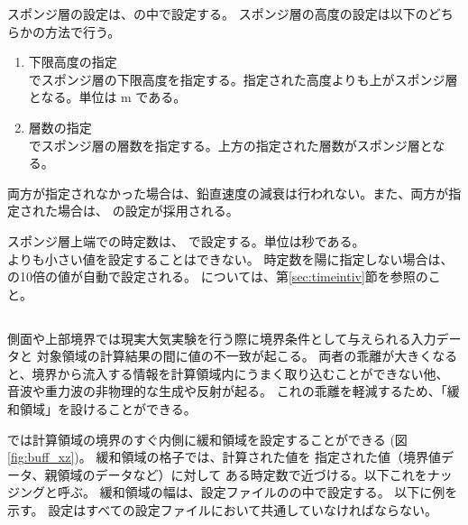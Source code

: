 スポンジ層の設定は、の中で設定する。
スポンジ層の高度の設定は以下のどちらかの方法で行う。
\begin{enumerate}
\item 下限高度の指定\\
   でスポンジ層の下限高度を指定する。指定された高度よりも上がスポンジ層となる。単位は m である。
\item 層数の指定\\
   でスポンジ層の層数を指定する。上方の指定された層数がスポンジ層となる。
\end{enumerate}
両方が指定されなかった場合は、鉛直速度の減衰は行われない。また、両方が指定された場合は、 の設定が採用される。

スポンジ層上端での時定数は、 で設定する。単位は秒である。\\
よりも小さい値を設定することはできない。
時定数を陽に指定しない場合は、 の10倍の値が自動で設定される。
については、第\ref{sec:timeintiv}節を参照のこと。



\subsection{\SubsecBasicBufferSetting} \label{subsec:buffer}
側面や上部境界では現実大気実験を行う際に境界条件として与えられる入力データと
対象領域の計算結果の間に値の不一致が起こる。
両者の乖離が大きくなると、境界から流入する情報を計算領域内にうまく取り込むことができない他、
音波や重力波の非物理的な生成や反射が起る。
これの乖離を軽減するため、「緩和領域」を設けることができる。



\scalerm では計算領域の境界のすぐ内側に緩和領域を設定することができる
(図\ref{fig:buff_xz})。
緩和領域の格子では、計算された値を
指定された値（境界値データ、親領域のデータなど）に対して
ある時定数で近づける。以下これをナッジングと呼ぶ。
緩和領域の幅は、設定ファイルのの中で設定する。
以下に例を示す。
設定はすべての設定ファイルにおいて共通していなければならない。

\\


